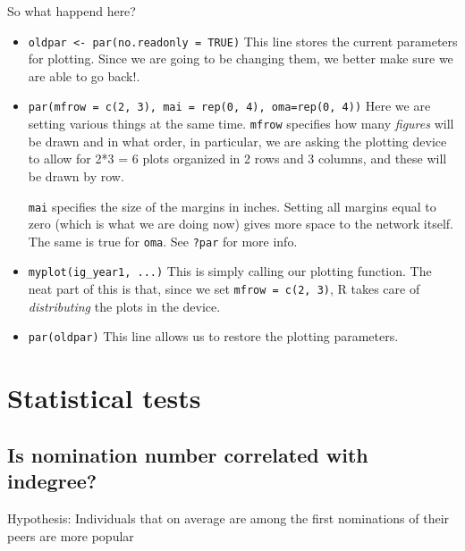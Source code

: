\documentclass[]{book}
\theoremstyle{definition}
\theoremstyle{definition}
\theoremstyle{definition}
\theoremstyle{remark}
\begin{document}
So what happend here?

\begin{itemize}
\item
  \texttt{oldpar\ \textless{}-\ par(no.readonly\ =\ TRUE)} This line
  stores the current parameters for plotting. Since we are going to be
  changing them, we better make sure we are able to go back!.
\item
  \texttt{par(mfrow\ =\ c(2,\ 3),\ mai\ =\ rep(0,\ 4),\ oma=rep(0,\ 4))}
  Here we are setting various things at the same time. \texttt{mfrow}
  specifies how many \emph{figures} will be drawn and in what order, in
  particular, we are asking the plotting device to allow for 2*3 = 6
  plots organized in 2 rows and 3 columns, and these will be drawn by
  row.

  \texttt{mai} specifies the size of the margins in inches. Setting all
  margins equal to zero (which is what we are doing now) gives more
  space to the network itself. The same is true for \texttt{oma}. See
  \texttt{?par} for more info.
\item
  \texttt{myplot(ig\_year1,\ ...)} This is simply calling our plotting
  function. The neat part of this is that, since we set
  \texttt{mfrow\ =\ c(2,\ 3)}, R takes care of \emph{distributing} the
  plots in the device.
\item
  \texttt{par(oldpar)} This line allows us to restore the plotting
  parameters.
\end{itemize}

\section{Statistical tests}\label{statistical-tests}

\subsection{Is nomination number correlated with
indegree?}\label{is-nomination-number-correlated-with-indegree}

Hypothesis: Individuals that on average are among the first nominations
of their peers are more popular
\end{document}
